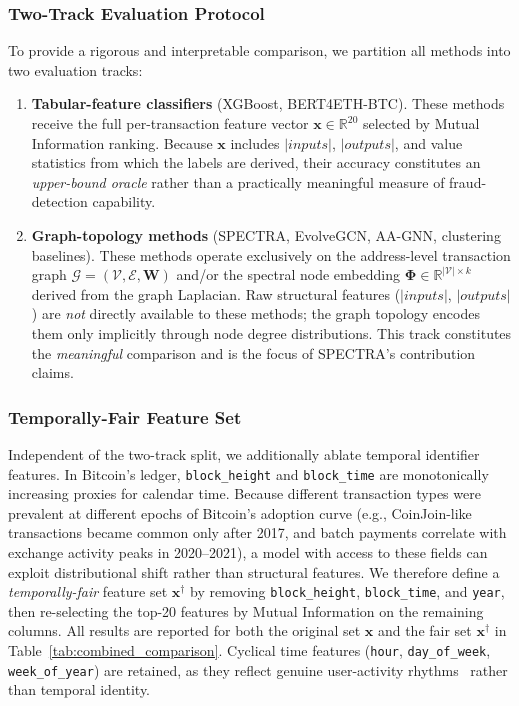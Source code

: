 \documentclass[journal]{IEEEtran}
\begin{document}
\subsubsection{Two-Track Evaluation Protocol}
To provide a rigorous and interpretable comparison, we partition all methods
into two evaluation tracks:

\begin{enumerate}[leftmargin=*, label=\textbf{T\arabic*}]

  \item \textbf{Tabular-feature classifiers} (XGBoost, BERT4ETH-BTC).
    These methods receive the full per-transaction feature vector
    $\mathbf{x} \in \mathbb{R}^{20}$ selected by Mutual Information ranking.
    Because $\mathbf{x}$ includes $|\mathit{inputs}|$, $|\mathit{outputs}|$,
    and value statistics from which the labels are derived, their accuracy
    constitutes an \emph{upper-bound oracle} rather than a practically
    meaningful measure of fraud-detection capability.

  \item \textbf{Graph-topology methods} (SPECTRA, EvolveGCN, AA-GNN,
    clustering baselines).
    These methods operate exclusively on the address-level transaction graph
    $\mathcal{G} = (\mathcal{V}, \mathcal{E}, \mathbf{W})$ and/or the
    spectral node embedding $\boldsymbol{\Phi} \in \mathbb{R}^{|\mathcal{V}| \times k}$
    derived from the graph Laplacian.
    Raw structural features ($|\mathit{inputs}|$, $|\mathit{outputs}|$) are
    \emph{not} directly available to these methods; the graph topology
    encodes them only implicitly through node degree distributions.
    This track constitutes the \emph{meaningful} comparison and is the
    focus of SPECTRA's contribution claims.

\end{enumerate}

\subsubsection{Temporally-Fair Feature Set}
Independent of the two-track split, we additionally ablate temporal
identifier features.
In Bitcoin's ledger, \texttt{block\_height} and \texttt{block\_time}
are monotonically increasing proxies for calendar time.
Because different transaction types were prevalent at different epochs
of Bitcoin's adoption curve (e.g., CoinJoin-like transactions became
common only after 2017, and batch payments correlate with exchange activity
peaks in 2020--2021), a model with access to these fields can exploit
distributional shift rather than structural features.
We therefore define a \emph{temporally-fair} feature set
$\mathbf{x}^{\dagger}$ by removing \texttt{block\_height},
\texttt{block\_time}, and \texttt{year}, then re-selecting the top-20
features by Mutual Information on the remaining columns.
All results are reported for both the original set $\mathbf{x}$ and
the fair set $\mathbf{x}^{\dagger}$ in Table~\ref{tab:combined_comparison}.
Cyclical time features (\texttt{hour}, \texttt{day\_of\_week},
\texttt{week\_of\_year}) are retained, as they reflect genuine
user-activity rhythms~\cite{Ron2013} rather than temporal identity.
\end{document}
